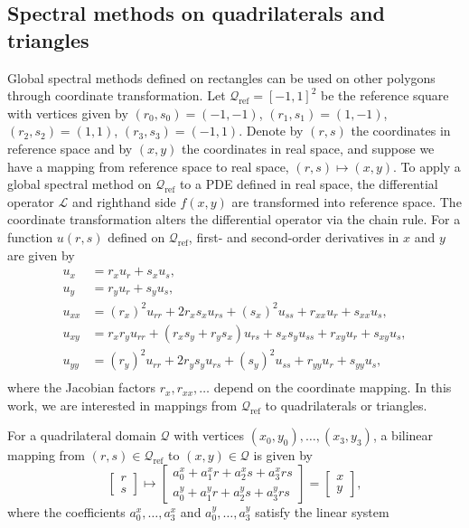 \subsection{Spectral methods on quadrilaterals and triangles}\label{sec:\chap:quad_tri}
Global spectral methods defined on rectangles can be used on other polygons through coordinate transformation. Let $\mathcal{Q}_\text{ref} = [-1,1]^2$ be the reference square with vertices given by $(r_0,s_0) = (-1,-1)$, $(r_1,s_1) = (1,-1)$, $(r_2,s_2) = (1,1)$, $(r_3,s_3) = (-1,1)$. Denote by $(r,s)$ the coordinates in reference space and by $(x,y)$ the coordinates in real space, and suppose we have a mapping from reference space to real space, $(r,s) \mapsto (x,y)$. To apply a global spectral method on $\mathcal{Q}_\text{ref}$ to a PDE defined in real space, the differential operator $\mathcal{L}$ and righthand side $f(x,y)$ are transformed into reference space. The coordinate transformation alters the differential operator via the chain rule. For a function $u(r,s)$ defined on $\mathcal{Q}_\text{ref}$, first- and second-order derivatives in $x$ and $y$ are given by
\[
\begin{aligned}
u_x &= r_x u_r + s_x u_s, \\
u_y &= r_y u_r + s_y u_s, \\
u_{xx} &= (r_x)^2 u_{rr} + 2 r_x s_x u_{rs} + (s_x)^2 u_{ss} + r_{xx} u_r + s_{xx} u_s, \\
u_{xy} &= r_x r_y u_{rr} + (r_x s_y + r_y s_x) u_{rs} + s_x s_y u_{ss} + r_{xy} u_r + s_{xy} u_s, \\
u_{yy} &= (r_y)^2 u_{rr} + 2 r_y s_y u_{rs} + (s_y)^2 u_{ss} + r_{yy} u_r + s_{yy} u_s, \\
\end{aligned}
\]
where the Jacobian factors $r_x, r_{xx}, \ldots$ depend on the coordinate mapping. In this work, we are interested in mappings from $\mathcal{Q}_\text{ref}$ to quadrilaterals or triangles.

For a quadrilateral domain $\mathcal{Q}$ with vertices $(x_0,y_0), \ldots, (x_3,y_3)$, a bilinear mapping from $(r,s) \in \mathcal{Q}_\text{ref}$ to $(x,y) \in \mathcal{Q}$ is given by
\[
\begin{bmatrix} r \\ s \end{bmatrix}
\mapsto
\begin{bmatrix} a_0^x + a_1^x r + a_2^x s + a_3^x r s \\[0.2em] a_0^y + a_1^y r + a_2^y s + a_3^y r s \end{bmatrix}
=
\begin{bmatrix} x \\ y \end{bmatrix},
\]
where the coefficients $a_0^x, \ldots, a_3^x$ and $a_0^y, \ldots, a_3^y$ satisfy the linear system

